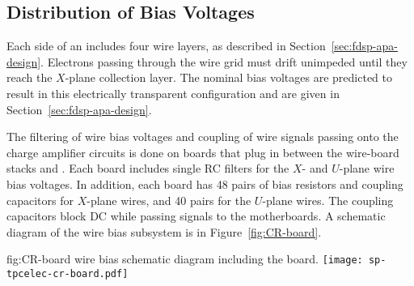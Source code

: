\subsection{Distribution of Bias Voltages}
\label{sec:fdsp-tpcelec-design-bias}


Each side of an  includes four wire layers, as described in Section~\ref{sec:fdsp-apa-design}. 
Electrons passing through the wire grid must drift unimpeded until they reach the $X$-plane 
collection layer. The nominal bias voltages are predicted to result in this electrically 
transparent configuration and are given in Section~\ref{sec:fdsp-apa-design}. 

The filtering of wire bias voltages and  coupling of wire signals passing
onto the charge amplifier circuits is done on  boards that plug in between the  wire-board stacks and .
Each  board includes single RC filters for the $X$- and $U$-plane wire bias voltages. In addition, each board has \num{48} 
pairs of bias resistors and  coupling capacitors for $X$-plane wires, and \num{40} pairs for the $U$-plane wires. The coupling capacitors block DC while passing  
signals to the  motherboards.  A schematic diagram of the   wire bias subsystem is in Figure~\ref{fig:CR-board}.

\begin{dunefigure}
	{fig:CR-board}
	{  wire bias schematic diagram including the  board.}
\texttt{[image: sp-tpcelec-cr-board.pdf]}
\end{dunefigure}


